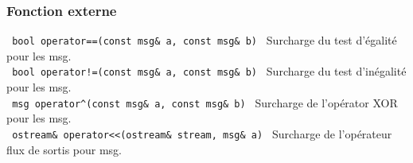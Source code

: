 \documentclass[10pt,a4paper]{article}
\begin{document}
\subsubsection*{Fonction externe}
\verb| bool operator==(const msg& a, const msg& b) | Surcharge du test d'égalité pour les msg.\\
\verb| bool operator!=(const msg& a, const msg& b) | Surcharge du test d'inégalité pour les msg.\\
\verb| msg operator^(const msg& a, const msg& b) | Surcharge de l'opérator XOR pour les msg.\\
\verb| ostream& operator<<(ostream& stream, msg& a) | Surcharge de l'opérateur flux de sortis pour msg.
\end{document}
